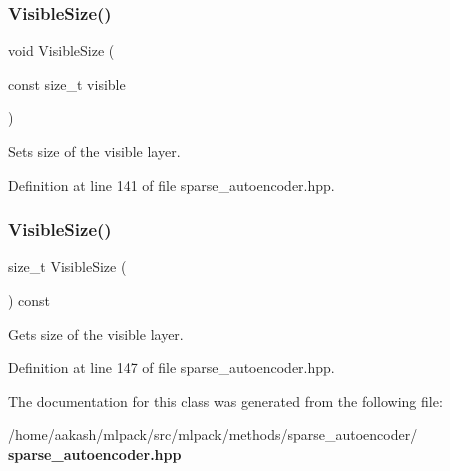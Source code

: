 \subsubsection{Visible\+Size()\hspace{0.1cm}{\footnotesize\ttfamily [1/2]}}
{\footnotesize\ttfamily void Visible\+Size (\begin{DoxyParamCaption}\item[{const size\+\_\+t}]{visible }\end{DoxyParamCaption})\hspace{0.3cm}{\ttfamily [inline]}}



Sets size of the visible layer. 



Definition at line 141 of file sparse\+\_\+autoencoder.\+hpp.

\mbox{\label{classmlpack_1_1nn_1_1SparseAutoencoder_a3cea635d43096bb8cd925c74dcdd1d48}} 
\subsubsection{Visible\+Size()\hspace{0.1cm}{\footnotesize\ttfamily [2/2]}}
{\footnotesize\ttfamily size\+\_\+t Visible\+Size (\begin{DoxyParamCaption}{ }\end{DoxyParamCaption}) const\hspace{0.3cm}{\ttfamily [inline]}}



Gets size of the visible layer. 



Definition at line 147 of file sparse\+\_\+autoencoder.\+hpp.



The documentation for this class was generated from the following file\+:\begin{DoxyCompactItemize}
\item 
/home/aakash/mlpack/src/mlpack/methods/sparse\+\_\+autoencoder/\textbf{ sparse\+\_\+autoencoder.\+hpp}\end{DoxyCompactItemize}
